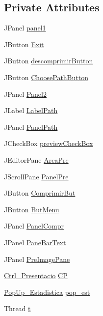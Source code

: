 \subsection*{Private Attributes}
\begin{DoxyCompactItemize}
\item 
J\+Panel \hyperlink{classpresentacion_1_1form_1_1mainForm_aa43e009cc6dc09d4e637385fbd361510}{panel1}
\item 
J\+Button \hyperlink{classpresentacion_1_1form_1_1mainForm_a721fa95a4d72e8f68875fcc0003e041f}{Exit}
\item 
J\+Button \hyperlink{classpresentacion_1_1form_1_1mainForm_a336e6855f8a19241d02376d4ff6a1802}{descomprimir\+Button}
\item 
J\+Button \hyperlink{classpresentacion_1_1form_1_1mainForm_a0f7073c8a28d814154d208bc924fedb4}{Choose\+Path\+Button}
\item 
J\+Panel \hyperlink{classpresentacion_1_1form_1_1mainForm_a40e87b5e341114287b070012a4aadc8f}{Panel2}
\item 
J\+Label \hyperlink{classpresentacion_1_1form_1_1mainForm_a54f7619a7cbb904b26c32ccaef512573}{Label\+Path}
\item 
J\+Panel \hyperlink{classpresentacion_1_1form_1_1mainForm_a0704eebe3c2e55cfd3b9344cca4d2d4b}{Panel\+Path}
\item 
J\+Check\+Box \hyperlink{classpresentacion_1_1form_1_1mainForm_a0dbe9873e69c0702a519d1cd171594c0}{preview\+Check\+Box}
\item 
J\+Editor\+Pane \hyperlink{classpresentacion_1_1form_1_1mainForm_a957286f19a01eedc946c0f666636fb21}{Area\+Pre}
\item 
J\+Scroll\+Pane \hyperlink{classpresentacion_1_1form_1_1mainForm_aed4360d9cf00129ea2fd69fd26fccca7}{Panel\+Pre}
\item 
J\+Button \hyperlink{classpresentacion_1_1form_1_1mainForm_a8a68ad38dda26d35d37dccec4fa9338d}{Comprimir\+But}
\item 
J\+Button \hyperlink{classpresentacion_1_1form_1_1mainForm_aef69e0291d6680e935cf1161971b3b29}{But\+Menu}
\item 
J\+Panel \hyperlink{classpresentacion_1_1form_1_1mainForm_a2d0f3d20d2a80c16321aaccbc273279d}{Panel\+Compr}
\item 
J\+Panel \hyperlink{classpresentacion_1_1form_1_1mainForm_ac9be802423980739da49eb0cb63d46ca}{Pane\+Bar\+Text}
\item 
J\+Panel \hyperlink{classpresentacion_1_1form_1_1mainForm_a78bf2e66ab2d90d38322f3a7887d29e4}{Pre\+Image\+Pane}
\item 
\hyperlink{classpresentacion_1_1Ctrl__Presentacio_1_1Ctrl__Presentacio}{Ctrl\+\_\+\+Presentacio} \hyperlink{classpresentacion_1_1form_1_1mainForm_a4d01396f002d4f9bd18db3877057c77b}{CP}
\item 
\hyperlink{classpresentacion_1_1form_1_1PopUp__Estadistica}{Pop\+Up\+\_\+\+Estadistica} \hyperlink{classpresentacion_1_1form_1_1mainForm_ae04f75ed65fa9e0347f645e877f6eb95}{pop\+\_\+est}
\item 
Thread \hyperlink{classpresentacion_1_1form_1_1mainForm_a4643a7a227b8b65874d63d33a5adfc33}{t}
\end{DoxyCompactItemize}


